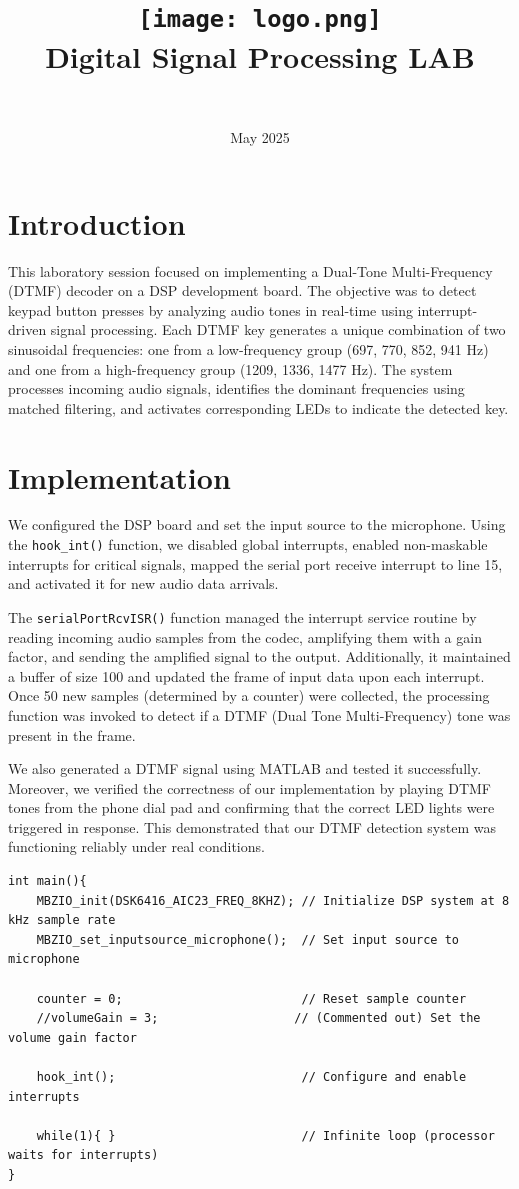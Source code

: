 \documentclass{article}
\title{
    \texttt{[image: logo.png]} \\ 
    Digital Signal Processing LAB \\ \exerciseset
}
\author{\FirstAuthor \\ \SecondAuthor}
\date{May 2025}
\begin{document}
\maketitle

\section*{Introduction}
This laboratory session focused on implementing a Dual-Tone Multi-Frequency (DTMF) decoder on a DSP development board. The objective was to detect keypad button presses by analyzing audio tones in real-time using interrupt-driven signal processing. Each DTMF key generates a unique combination of two sinusoidal frequencies: one from a low-frequency group (697, 770, 852, 941 Hz) and one from a high-frequency group (1209, 1336, 1477 Hz). The system processes incoming audio signals, identifies the dominant frequencies using matched filtering, and activates corresponding LEDs to indicate the detected key.

\section*{Implementation}

We configured the DSP board and set the input source to the microphone. Using the \texttt{hook\_int()} function, we disabled global interrupts, enabled non-maskable interrupts for critical signals, mapped the serial port receive interrupt to line 15, and activated it for new audio data arrivals.

The \texttt{serialPortRcvISR()} function managed the interrupt service routine by reading incoming audio samples from the codec, amplifying them with a gain factor, and sending the amplified signal to the output. Additionally, it maintained a buffer of size 100 and updated the frame of input data upon each interrupt. Once 50 new samples (determined by a counter) were collected, the processing function was invoked to detect if a DTMF (Dual Tone Multi-Frequency) tone was present in the frame.

We also generated a DTMF signal using MATLAB and tested it successfully. Moreover, we verified the correctness of our implementation by playing DTMF tones from the phone dial pad and confirming that the correct LED lights were triggered in response. This demonstrated that our DTMF detection system was functioning reliably under real conditions.

\begin{lstlisting}
int main(){
    MBZIO_init(DSK6416_AIC23_FREQ_8KHZ); // Initialize DSP system at 8 kHz sample rate
    MBZIO_set_inputsource_microphone();  // Set input source to microphone

    counter = 0;                         // Reset sample counter
    //volumeGain = 3;                   // (Commented out) Set the volume gain factor

    hook_int();                          // Configure and enable interrupts

    while(1){ }                          // Infinite loop (processor waits for interrupts)
}
\end{lstlisting}
\end{document}
